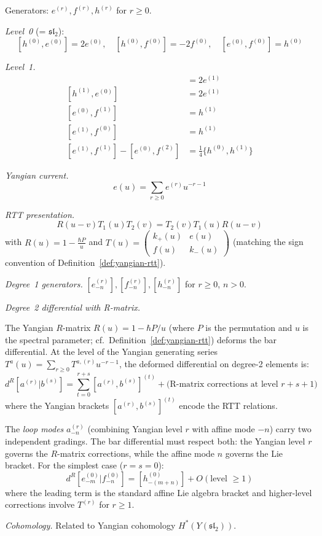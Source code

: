 \begin{computation}\label{comp:yangian-sl2}
Generators: $e^{(r)}, f^{(r)}, h^{(r)}$ for $r \geq 0$.

\emph{Level~0} (= $\mathfrak{sl}_2$):
\[
[h^{(0)}, e^{(0)}] = 2e^{(0)}, \quad [h^{(0)}, f^{(0)}] = -2f^{(0)}, \quad [e^{(0)}, f^{(0)}] = h^{(0)}
\]

\emph{Level~1.}
\begin{align*}
[h^{(0)}, e^{(1)}] &= 2e^{(1)} \\
[h^{(1)}, e^{(0)}] &= 2e^{(1)} \\
[e^{(0)}, f^{(1)}] &= h^{(1)} \\
[e^{(1)}, f^{(0)}] &= h^{(1)} \\
[e^{(1)}, f^{(1)}] - [e^{(0)}, f^{(2)}] &= \frac{1}{4}\{h^{(0)}, h^{(1)}\}
\end{align*}

\emph{Yangian current.}
\[
e(u) = \sum_{r \geq 0} e^{(r)} u^{-r-1}
\]

\emph{RTT presentation.}
\[
R(u-v) T_1(u) T_2(v) = T_2(v) T_1(u) R(u-v)
\]
with $R(u) = 1 - \frac{\hbar P}{u}$ and $T(u) = \begin{pmatrix} k_+(u) & e(u) \\ f(u) & k_-(u) \end{pmatrix}$ (matching the sign convention of Definition~\ref{def:yangian-rtt}).
\end{computation}

\begin{computation}\label{comp:yangian-bar-full}
\emph{Degree~1 generators.} $[e^{(r)}_{-n}], [f^{(r)}_{-n}], [h^{(r)}_{-n}]$ for $r \geq 0$, $n > 0$.

\emph{Degree~2 differential with R-matrix.}

The Yangian $R$-matrix $R(u) = 1 - \hbar P/u$ (where $P$ is the permutation and $u$ is the spectral parameter; cf.\ Definition~\ref{def:yangian-rtt}) deforms the bar differential. At the level of the Yangian generating series $T^a(u) = \sum_{r \geq 0} T^{a,(r)} u^{-r-1}$, the deformed differential on degree-2 elements is:
\[
d^R[a^{(r)}|b^{(s)}] = \sum_{t=0}^{r+s} [a^{(r)}, b^{(s)}]^{(t)} + \text{(R-matrix corrections at level } r+s+1 \text{)}
\]
where the Yangian brackets $[a^{(r)}, b^{(s)}]^{(t)}$ encode the RTT relations.

The \emph{loop modes} $a^{(r)}_{-n}$ (combining Yangian level $r$ with affine mode $-n$) carry two independent gradings. The bar differential must respect both: the Yangian level $r$ governs the $R$-matrix corrections, while the affine mode $n$ governs the Lie bracket. For the simplest case ($r = s = 0$):
\[d^R[e^{(0)}_{-m}|f^{(0)}_{-n}] = [h^{(0)}_{-(m+n)}] + O(\text{level } \geq 1)\]
where the leading term is the standard affine Lie algebra bracket and higher-level corrections involve $T^{(r)}$ for $r \geq 1$.

\emph{Cohomology.} Related to Yangian cohomology $H^*(Y(\mathfrak{sl}_2))$.
\end{computation}



